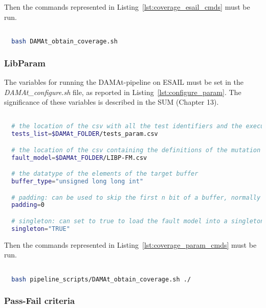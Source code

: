 Then the commands represented in Listing~\ref{lst:coverage_esail_cmds} must be run.

  \begin{lstlisting}[language=bash, label={lst:coverage_esail_cmds}]

  bash DAMAt_obtain_coverage.sh

  \end{lstlisting}

\subsubsection{LibParam}

The variables for running the DAMAt-pipeline on ESAIL must be set in the \emph{DAMAt\_configure.sh} file, as reported in Listing~\ref{lst:configure_param}. The significance of these variables is described in the SUM (Chapter 13).

  \begin{lstlisting}[language=bash, label={lst:configure_param}]

  # the location of the csv with all the test identifiers and the execution time
  tests_list=$DAMAt_FOLDER/tests_param.csv

  # the location of the csv containing the definitions of the mutation operators
  fault_model=$DAMAt_FOLDER/LIBP-FM.csv

  # the datatype of the elements of the target buffer
  buffer_type="unsigned long long int"

  # padding: can be used to skip the first n bit of a buffer, normally set to 0
  padding=0

  # singleton: can set to true to load the fault model into a singleton variable, normally set to "TRUE", can also  be set to "FALSE"
  singleton="TRUE"

  \end{lstlisting}

Then the commands represented in Listing~\ref{lst:coverage_param_cmds} must be run.

  \begin{lstlisting}[language=bash, label={lst:coverage_param_cmds}]

  bash pipeline_scripts/DAMAt_obtain_coverage.sh ./

  \end{lstlisting}

\subsubsection{Pass-Fail criteria}


